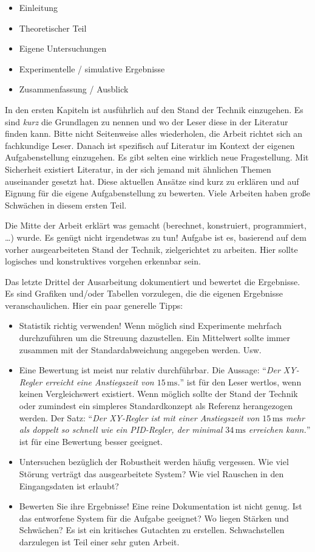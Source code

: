 \begin{itemize}
	\item Einleitung
	\item Theoretischer Teil
	\item Eigene Untersuchungen
	\item Experimentelle / simulative Ergebnisse
	\item Zusammenfassung / Ausblick
\end{itemize}

In den ersten Kapiteln ist ausführlich auf den Stand der Technik einzugehen. Es sind \emph{kurz} die Grundlagen zu nennen und wo der Leser diese in der Literatur finden kann. Bitte nicht Seitenweise alles wiederholen, die Arbeit richtet sich an fachkundige Leser. Danach ist spezifisch auf Literatur im Kontext der eigenen Aufgabenstellung einzugehen. Es gibt selten eine wirklich neue Fragestellung. Mit Sicherheit existiert Literatur, in der sich jemand mit ähnlichen Themen auseinander gesetzt hat. Diese aktuellen Ansätze sind kurz zu erklären und auf Eignung für die eigene Aufgabenstellung zu bewerten. Viele Arbeiten haben große Schwächen in diesem ersten Teil.

Die Mitte der Arbeit erklärt was gemacht (berechnet, konstruiert, programmiert, \ldots) wurde. Es genügt nicht irgendetwas zu tun! Aufgabe ist es, basierend auf dem vorher ausgearbeiteten Stand der Technik, zielgerichtet zu arbeiten. Hier sollte logisches und konstruktives vorgehen erkennbar sein.

Das letzte Drittel der Ausarbeitung dokumentiert und bewertet die Ergebnisse. Es sind Grafiken und/oder Tabellen vorzulegen, die die eigenen Ergebnisse veranschaulichen. Hier ein paar generelle Tipps:

\begin{itemize}
	\item Statistik richtig verwenden! Wenn möglich sind Experimente mehrfach durchzuführen um die Streuung dazustellen. Ein Mittelwert sollte immer zusammen mit der Standardabweichung angegeben werden. Usw.
	\item Eine Bewertung ist meist nur relativ durchführbar. Die Aussage: "`\emph{Der XY-Regler erreicht eine Anstiegszeit von $15\,\mathrm{ms}$.}"' ist für den Leser wertlos, wenn keinen Vergleichswert existiert. Wenn möglich sollte der Stand der Technik oder zumindest ein simpleres Standardkonzept als Referenz herangezogen werden. Der Satz: "`\emph{Der XY-Regler ist mit einer Anstiegszeit von $15\,\mathrm{ms}$ mehr als doppelt so schnell wie ein PID-Regler, der minimal $34\,\mathrm{ms}$ erreichen kann.}"' ist für eine Bewertung besser geeignet.
	\item Untersuchen bezüglich der Robustheit werden häufig vergessen. Wie viel Störung verträgt das ausgearbeitete System? Wie viel Rauschen in den Eingangsdaten ist erlaubt?
	\item Bewerten Sie ihre Ergebnisse! Eine reine Dokumentation ist nicht genug. Ist das entworfene System für die Aufgabe geeignet? Wo liegen Stärken und Schwächen? Es ist ein kritisches Gutachten zu erstellen. Schwachstellen darzulegen ist Teil einer sehr guten Arbeit. 
\end{itemize}

